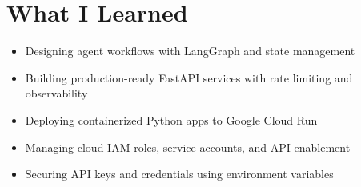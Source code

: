 \documentclass[11pt]{article}
\begin{document}
\section{What I Learned}
\begin{itemize}[leftmargin=*]
    \item Designing agent workflows with LangGraph and state management
    \item Building production-ready FastAPI services with rate limiting and observability
    \item Deploying containerized Python apps to Google Cloud Run
    \item Managing cloud IAM roles, service accounts, and API enablement
    \item Securing API keys and credentials using environment variables
\end{itemize}
\end{document}
